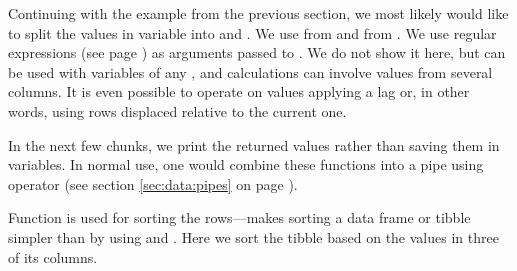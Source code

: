 \documentclass[krantz2]{krantz}\usepackage{knitr}
\begin{document}
Continuing with the example from the previous section, we most likely would like to split the values in variable  into  and . We use  from  and  from . We use regular expressions (see page \pageref{}) as arguments passed to .  We do not show it here, but  can be used with variables of any , and calculations can involve values from several columns. It is even possible to operate on values applying a lag or, in other words, using rows displaced relative to the current one.

\begin{knitrout}\footnotesize
{}\color{fgcolor}
\end{knitrout}

In the next few chunks, we print the returned values rather than saving them in variables. In normal use, one would combine these functions into a pipe using operator  (see section \ref{sec:data:pipes} on page \pageref{sec:data:pipes}).

Function  is used for sorting the rows---makes sorting a data frame or tibble simpler than by using  and . Here we sort the tibble  based on the values in three of its columns.
\end{document}
